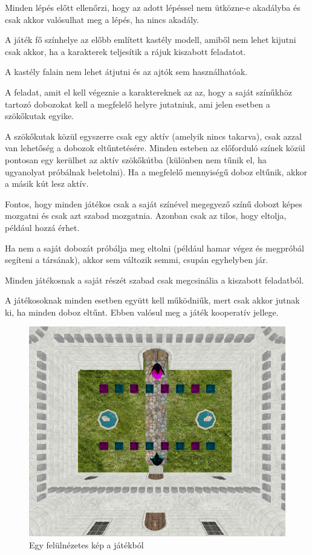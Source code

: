 Minden lépés előtt ellenőrzi, hogy az adott lépéssel nem ütközne-e akadályba és csak akkor valósulhat meg a lépés, ha nincs akadály.


A játék fő színhelye az előbb említett kastély modell, amiből nem lehet kijutni csak akkor, ha a karakterek teljesítik a rájuk kiszabott feladatot.

A kastély falain nem lehet átjutni és az ajtók sem használhatóak.

A feladat, amit el kell végeznie a karaktereknek az az, hogy a saját színűkhöz tartozó dobozokat kell a megfelelő helyre jutatniuk, ami jelen esetben a szökőkutak egyike. 

A szökőkutak közül egyszerre csak egy aktív (amelyik nincs takarva), csak azzal van lehetőség a dobozok eltűntetésére. Minden esteben az előforduló színek közül pontosan egy kerülhet az aktív szökőkútba (különben nem tűnik el, ha ugyanolyat próbálnak beletolni). Ha a megfelelő mennyiségű doboz eltűnik, akkor a másik kút lesz aktív.

Fontos, hogy minden játékos csak a saját színével megegyező színű dobozt képes mozgatni és csak azt szabad mozgatnia. Azonban csak az tilos, hogy eltolja, például hozzá érhet.

Ha nem a saját dobozát próbálja meg eltolni (például hamar végez és megpróbál segíteni a társának), akkor sem változik semmi, csupán egyhelyben jár.

Minden játékosnak a saját részét szabad csak megcsinália a kiszabott feladatból. 

A játékosoknak minden esetben együtt kell működniűk, mert csak akkor jutnak ki, ha minden doboz eltűnt. Ebben valósul meg a játék kooperatív jellege. 

\begin{figure}[htp]
    \centering
   	\includegraphics[scale=0.7]{images/game.png}
	\caption{Egy felülnézetes kép a játékból}
	\label{fig:game}
\end{figure}

